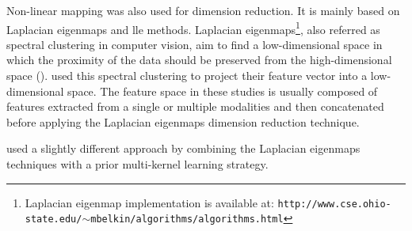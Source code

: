 Non-linear mapping was also used for dimension reduction. It is mainly based on Laplacian eigenmaps and \acf{lle} methods. Laplacian eigenmaps\footnote{Laplacian eigenmap implementation is available at: \texttt{http://www.cse.\allowbreak ohio-state.edu/$\sim$mbelkin/algorithms/algorithms.html}}, also referred as spectral clustering in computer vision, aim to find a low-dimensional space in which the proximity of the data should be preserved from the high-dimensional space (\cite{Shi2000,Belkin2001}). %
%
%
%
%
%
\cite{Tiwari2007,Tiwari2009,Tiwari2009a,Viswanath2008} used this spectral clustering to project their feature vector into a low-dimensional space. The feature space in these studies is usually composed of features extracted from a single or multiple modalities and then concatenated before applying the Laplacian eigenmaps dimension reduction technique.

\cite{Tiwari2009,Tiwari2013} used a slightly different approach by combining the Laplacian eigenmaps techniques with a prior multi-kernel learning strategy.%
%
%

